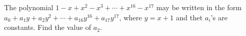 The polynomial $1-x+x^2-x^3+\cdots+x^{16}-x^{17}$ may be written in the form $a_0+a_1y+a_2y^2+\cdots +a_{16}y^{16}+a_{17}y^{17}$, where $y=x+1$ and thet $a_i$'s are constants. Find the value of $a_2$.